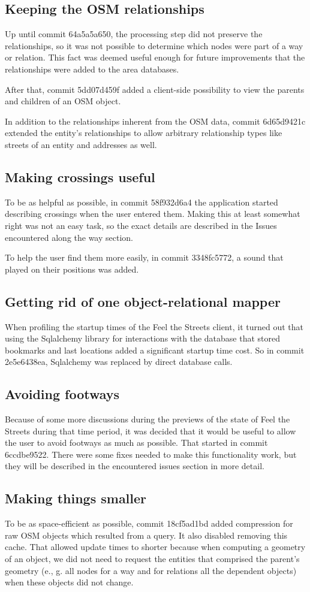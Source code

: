 \documentclass[nolof,digital]{fithesis3}
\begin{document}
\subsection{Keeping the OSM relationships}
Up until commit 64a5a5a650, the processing step did not preserve the relationships, so it was not possible to determine which nodes were part of a way or relation. This fact was deemed useful enough for future improvements that the relationships were added to the area databases.

After that, commit 5dd07d459f added a client-side possibility to view the parents and children of an OSM object.

In addition to the relationships inherent from the OSM data, commit 6d65d9421c extended the entity's relationships to allow arbitrary relationship types like streets of an entity and addresses as well. 
\subsection{Making crossings useful}
To be as helpful as possible, in commit 58f932d6a4 the application started describing crossings when the user entered them. Making this at least somewhat right was not an easy task, so the exact details are described in the Issues encountered along the way section.

To help the user find them more easily, in commit 3348fc5772, a sound that played on their positions was added.
\subsection{Getting rid of one object-relational mapper}
When profiling the startup times of the Feel the Streets client, it turned out that using the Sqlalchemy library for interactions with the database that stored bookmarks and last locations added a significant startup time cost. So in commit 2e5e6438ea, Sqlalchemy was replaced by direct database calls.
\subsection{Avoiding footways}
Because of some more discussions during the previews of the state of Feel the Streets during that time period, it was decided that it would be useful to allow the user to avoid footways as much as possible. That started in commit 6ccdbe9522. There were some fixes needed to make this functionality work, but they will be described in the encountered issues section in more detail.
\subsection{Making things smaller}
To be as space-efficient as possible, commit 18cf5ad1bd added compression for raw OSM objects which resulted from a query. It also disabled removing this cache. That allowed update times to shorter because when computing a geometry of an object, we did not need to request the entities that comprised the parent's geometry (e., g. all nodes for a way and for relations all the dependent objects) when these objects did not change.
\end{document}
